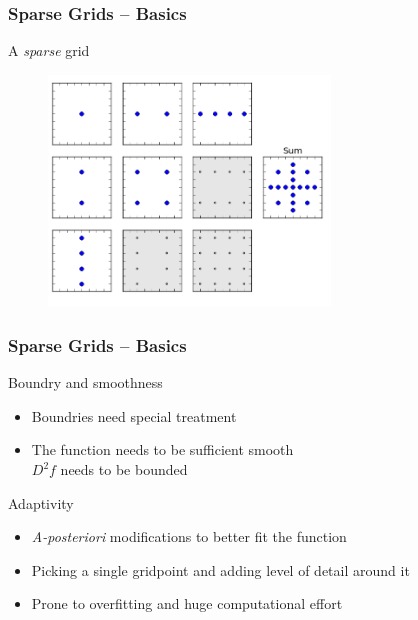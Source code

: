 \begin{frame}
  \frametitle{Sparse Grids -- Basics}
  \topline
  \vspace{-10px}
  \begin{block}{A \emph{sparse} grid}
    \begin{figure}[!htp]
      \centering
      \includegraphics[width=7.5cm]{images/sparsegrid_hirach2}
      \vspace{-12px}
      \caption{}
    \end{figure}
  \end{block}
\end{frame}

\begin{frame}
  \frametitle{Sparse Grids -- Basics}
  \topline
  \vspace{-10px}
  \begin{block}{Boundry and smoothness}
    \begin{itemize}
      \item Boundries need special treatment
      \item The function needs to be sufficient smooth \\
        $D^2f$ needs to be bounded
      \end{itemize}
  \end{block}
  \begin{block}{Adaptivity}
    \begin{itemize}
      \item \emph{A-posteriori} modifications to better fit the function
      \item Picking a single gridpoint and adding level of detail around it
      \item Prone to overfitting and huge computational effort
      \end{itemize}
  \end{block}
\end{frame}


